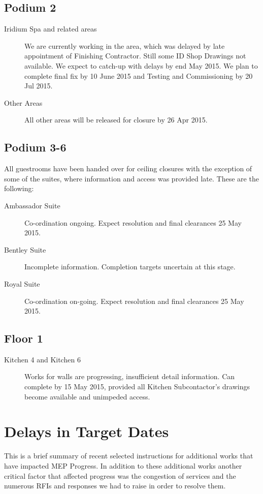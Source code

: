 \subsection{Podium 2}
\begin{description}
\item[Iridium Spa and related areas] We are currently working in the area, which was delayed by late appointment of Finishing Contractor. Still some ID Shop Drawings not available. We expect to catch-up with delays by end May 2015. We plan to complete final fix by 10 June 2015 and Testing and Commissioning by 20 Jul 2015.
\item[Other Areas] All other areas will be released for closure by 26 Apr 2015.
\end{description}

\subsection{Podium 3-6}

All guestrooms have been handed over for ceiling closures with the exception of some of the suites, where information and access was provided late. These are the following:

\begin{description}
\item[Ambassador Suite] Co-ordination ongoing. Expect resolution and final clearances 25 May 2015.
\item[Bentley Suite] Incomplete information. Completion targets uncertain at this stage.
\item[Royal Suite] Co-ordination on-going. Expect resolution and final clearances 25 May 2015.
\end{description}

\subsection{Floor 1}

\begin{description}
\item[Kitchen 4 and Kitchen 6] Works for walls are progressing, insufficient detail information. Can complete by 15 May 2015, provided all Kitchen Subcontactor’s drawings become available and unimpeded access.
\end{description}

\section{Delays in Target Dates}
\label{delays}
This is a brief summary of recent selected instructions for additional works that have impacted  MEP Progress. 
In addition to these additional works another critical factor that affected progress was the congestion of services and the numerous RFIs and responses we had to raise in order to resolve them.

